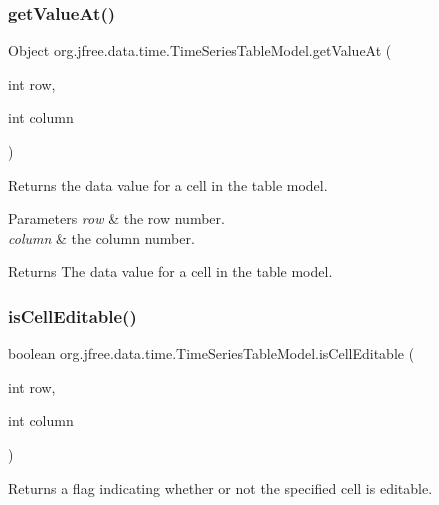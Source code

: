 \subsubsection{\texorpdfstring{get\+Value\+At()}{getValueAt()}}
{\footnotesize\ttfamily Object org.\+jfree.\+data.\+time.\+Time\+Series\+Table\+Model.\+get\+Value\+At (\begin{DoxyParamCaption}\item[{int}]{row,  }\item[{int}]{column }\end{DoxyParamCaption})}

Returns the data value for a cell in the table model.


\begin{DoxyParams}{Parameters}
{\em row} & the row number. \\
\hline
{\em column} & the column number.\\
\hline
\end{DoxyParams}
\begin{DoxyReturn}{Returns}
The data value for a cell in the table model. 
\end{DoxyReturn}
\mbox{\label{classorg_1_1jfree_1_1data_1_1time_1_1_time_series_table_model_af32cedeced693f9ceb8d4d15e2c556e6}} 
\subsubsection{\texorpdfstring{is\+Cell\+Editable()}{isCellEditable()}}
{\footnotesize\ttfamily boolean org.\+jfree.\+data.\+time.\+Time\+Series\+Table\+Model.\+is\+Cell\+Editable (\begin{DoxyParamCaption}\item[{int}]{row,  }\item[{int}]{column }\end{DoxyParamCaption})}

Returns a flag indicating whether or not the specified cell is editable.



